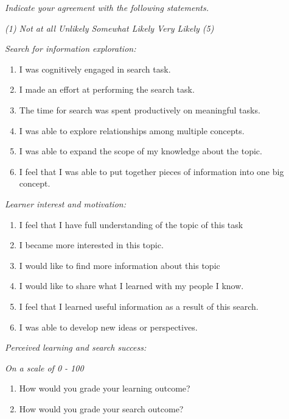 \documentclass[letterpaper, nobind]{templates/ociamthesis}
\providecommand{\tightlist}{%
  \setlength{\itemsep}{0pt}\setlength{\parskip}{0pt}}
\begin{document}
\emph{Indicate your agreement with the following statements.}

\emph{(1) Not at all \textbar{} Unlikely \textbar{} Somewhat \textbar{} Likely \textbar{} Very Likely (5)}

\emph{Search for information exploration:}

\begin{enumerate}
\def\labelenumi{\arabic{enumi}.}
\tightlist
\item
  I was cognitively engaged in search task.
\item
  I made an effort at performing the search task.
\item
  The time for search was spent productively on meaningful tasks.
\item
  I was able to explore relationships among multiple concepts.
\item
  I was able to expand the scope of my knowledge about the topic.
\item
  I feel that I was able to put together pieces of information into
  one big concept.
\end{enumerate}

\emph{Learner interest and motivation:}

\begin{enumerate}
\def\labelenumi{\arabic{enumi}.}
\setcounter{enumi}{6}
\item
  I feel that I have full understanding of the topic of this task
\item
  I became more interested in this topic.
\item
  I would like to find more information about this topic
\item
  I would like to share what I learned with my people I know.
\item
  I feel that I learned useful information as a result of this search.
\item
  I was able to develop new ideas or perspectives.
\end{enumerate}

\emph{Perceived learning and search success:}

\emph{On a scale of 0 - 100}

\begin{enumerate}
\def\labelenumi{\arabic{enumi}.}
\setcounter{enumi}{12}
\item
  How would you grade your learning outcome?
\item
  How would you grade your search outcome?
\end{enumerate}
\end{document}
